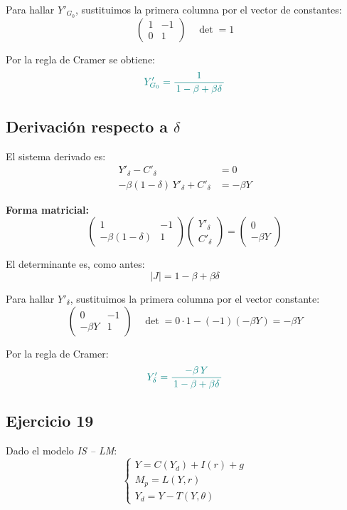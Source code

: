 \documentclass{article}
\begin{document}
Para hallar \(Y'_{G_0}\), sustituimos la primera columna por el vector de constantes:
\[
\begin{pmatrix}
1 & -1\\[0.8mm]
0 & 1
\end{pmatrix} \quad \det = 1
\]

Por la regla de Cramer se obtiene:
\[
\color{teal}
Y'_{G_0} = \frac{1}{\,1 - \beta + \beta\delta\,}
\]

\bigskip
\subsection*{Derivación respecto a \(\delta\)}

\medskip
El sistema derivado es:
\begin{align*}
Y'_{\delta} - C'_{\delta} &= 0 \\[1mm]
-\beta(1-\delta)\,Y'_{\delta} + C'_{\delta} &= -\beta Y
\end{align*}

\medskip
\textbf{Forma matricial:}
\[
\begin{pmatrix}
1 & -1\\[0.8mm]
-\beta(1-\delta) & 1
\end{pmatrix}
\begin{pmatrix}
Y'_{\delta}\\[0.8mm]
C'_{\delta}
\end{pmatrix}
=
\begin{pmatrix}
0\\[0.8mm]
-\beta Y
\end{pmatrix}
\]

El determinante es, como antes:
\[
|J| = 1 - \beta + \beta\delta
\]

Para hallar \(Y'_{\delta}\), sustituimos la primera columna por el vector constante:
\[
\begin{pmatrix}
0 & -1\\[0.8mm]
-\beta Y & 1
\end{pmatrix} \quad \det = 0\cdot 1 - (-1)(-\beta Y) = -\beta Y
\]

Por la regla de Cramer:
\[
\color{teal}
Y'_{\delta} = \frac{-\beta\,Y}{\,1 - \beta + \beta\delta\,}
\]

\newpage

\subsection{Ejercicio 19}

Dado el modelo \textit{IS -- LM}:
\[
\begin{cases}
Y = C(Y_d) + I(r) + g \\[6pt]
M_p = L(Y,r) \\[6pt]
Y_d = Y - T(Y,\theta)
\end{cases}
\]
\end{document}
